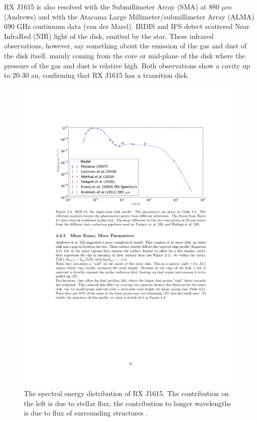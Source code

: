 \documentclass[twoside,single]{lion-msc}
\begin{document}
RX J1615 is also resolved with the Submillimeter Array (SMA) at 880 $\mu m$ (Andrews) and with the  Atacama Large Millimeter/submillimeter Array (ALMA) 690 GHz continuum data (van der Marel). IRDIS and IFS detect scattered Near InfraRed (NIR) light of the disk, emitted by the star. These infrared observations, however, say something about the emission of the gas and dust of the disk itself, mainly coming from the core or mid-plane of the disk where the pressure of the gas and dust is relative high. Both observations show a cavity up to 20-30 au, confirming that RX J1615 has a transition disk. 

\begin{figure}[htb]
\centering
\includegraphics[trim={2cm 18cm 2cm 3.7cm},clip,width = \textwidth]{SED.pdf}
\caption{The spectral energy distribution of RX J1615. The contribution on the left is due to stellar flux, the contribution to longer wavelengths is due to flux of surrounding structures \cite{thesis2014}.}
\label{fig:SED}
\end{figure}
\end{document}
